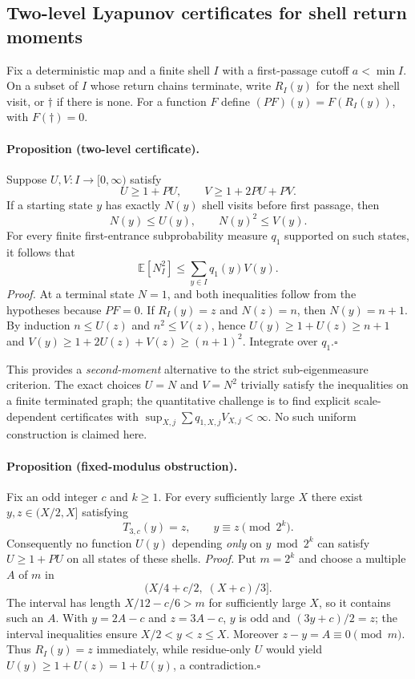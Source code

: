 \subsection*{Two-level Lyapunov certificates for shell return moments}
Fix a deterministic map and a finite shell $I$ with a first-passage
cutoff $a<\min I$.  On a subset of $I$ whose return chains terminate,
write $R_I(y)$ for the next shell visit, or $\dagger$ if there is none.
For a function $F$ define $(PF)(y)=F(R_I(y))$, with $F(\dagger)=0$.

\paragraph{Proposition (two-level certificate).}
Suppose $U,V:I\to[0,\infty)$ satisfy
\[
 U\ge 1+PU,\qquad V\ge 1+2PU+PV.
\]
If a starting state $y$ has exactly $N(y)$ shell visits before first
passage, then
\[
 N(y)\le U(y),\qquad N(y)^2\le V(y).
\]
For every finite first-entrance subprobability measure $q_1$ supported
on such states, it follows that
\[
 \boxed{\;\mathbb E[N_I^2]\le\sum_{y\in I}q_1(y)V(y).\;}
\]
\emph{Proof.}  At a terminal state $N=1$, and both inequalities follow
from the hypotheses because $PF=0$.  If $R_I(y)=z$ and $N(z)=n$,
then $N(y)=n+1$.  By induction $n\le U(z)$ and $n^2\le V(z)$, hence
$U(y)\ge 1+U(z)\ge n+1$ and
$V(y)\ge1+2U(z)+V(z)\ge(n+1)^2$.
Integrate over $q_1$.\hfill$\square$

This provides a \emph{second-moment} alternative to the strict
sub-eigenmeasure criterion.  The exact choices $U=N$ and $V=N^2$
trivially satisfy the inequalities on a finite terminated graph;
the quantitative challenge is to find explicit scale-dependent
certificates with $\sup_{X,j}\sum q_{1,X,j}V_{X,j}<\infty$.
No such uniform construction is claimed here.

\paragraph{Proposition (fixed-modulus obstruction).}
Fix an odd integer $c$ and $k\ge1$.  For every sufficiently large
$X$ there exist $y,z\in(X/2,X]$ satisfying
\[
 T_{3,c}(y)=z,\qquad y\equiv z\pmod{2^k}.
\]
Consequently no function $U(y)$ depending \emph{only} on
$y\bmod 2^k$ can satisfy $U\ge1+PU$ on all states of these shells.
\emph{Proof.}  Put $m=2^k$ and choose a multiple $A$ of $m$ in
\[
 (X/4+c/2,\;(X+c)/3].
\]
The interval has length $X/12-c/6>m$ for sufficiently large $X$,
so it contains such an $A$.  With $y=2A-c$ and $z=3A-c$,
$y$ is odd and $(3y+c)/2=z$; the interval inequalities ensure
$X/2<y<z\le X$.  Moreover $z-y=A\equiv0\pmod m$.
Thus $R_I(y)=z$ immediately, while residue-only $U$ would yield
$U(y)\ge 1+U(z)=1+U(y)$, a contradiction.\hfill$\square$

